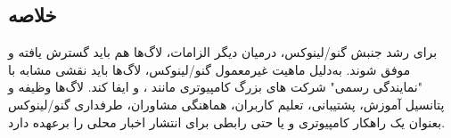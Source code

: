 \subsection{خلاصه}

برای رشد جنبش گنو/لینوکس، درمیان دیگر الزامات، لاگ‌ها هم باید گسترش یافته و موفق شوند.
به‌دلیل ماهیت غیرمعمول گنو/لینوکس، لاگ‌ها باید نقشی مشابه با "نمایندگی رسمی"
شرکت های بزرگ کامپیوتری مانند
،  و 
ایفا کند. لاگ‌ها وظیفه و پتانسیل آموزش، پشتیبانی، تعلیم کاربران، هماهنگی مشاوران،
طرفداری گنو/لینوکس بعنوان یک راهکار کامپیوتری و یا حتی رابطی برای انتشار اخبار محلی را برعهده دارد.

